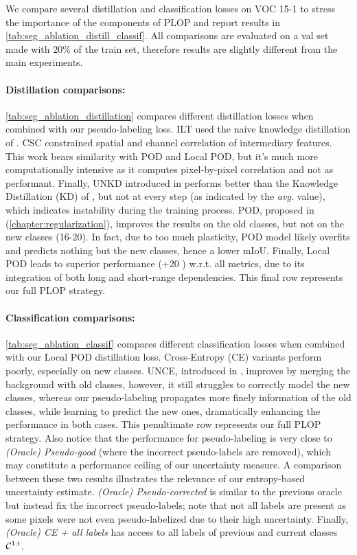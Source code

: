 We compare several distillation and classification losses on VOC 15-1 to stress the importance of
the components of PLOP and report results in \autoref{tab:seg_ablation_distill_classif}. All
comparisons are evaluated on a val set made with 20\% of the train set, therefore results are
slightly different from the main experiments.

\paragraph{Distillation comparisons:} \autoref{tab:seg_ablation_distillation} compares different
distillation losses when combined with our pseudo-labeling loss. ILT \citep{michieli2019ilt} used
the naive knowledge distillation of \cite{hinton2015knowledge_distillation}. CSC \citep{park2020csc}
constrained spatial and channel correlation of intermediary features. This work bears similarity
with POD and Local POD, but it's much more computationally intensive as it computes pixel-by-pixel
correlation and not as performant. Finally, UNKD introduced in
\cite{cermelli2020modelingthebackground} performs better than the Knowledge Distillation (KD) of
\cite{hinton2015knowledge_distillation}, but not at every step (as indicated by the \textit{avg.}
value), which indicates instability during the training process. POD, proposed in
\cite{douillard2020podnet} (\autoref{chapter:regularization}), improves the results on the old
classes, but not on the new classes (16-20). In fact, due to too much plasticity, POD model likely
overfits and predicts nothing but the new classes, hence a lower \ac{mIoU}.  Finally, Local POD
leads to superior performance (+20 \pp) w.r.t. all metrics, due to its integration of both long and
short-range dependencies. This final row represents our full PLOP strategy.


\paragraph{Classification comparisons:} \autoref{tab:seg_ablation_classif} compares different
classification losses when combined with our Local POD distillation loss. Cross-Entropy (CE)
variants perform poorly, especially on new classes. UNCE, introduced in
\citep{cermelli2020modelingthebackground}, improves by merging the background with old classes,
however, it still struggles to correctly model the new classes, whereas our pseudo-labeling
propagates more finely information of the old classes, while learning to predict the new ones,
dramatically enhancing the performance in both cases. This penultimate row represents our full PLOP
strategy. Also notice that the performance for pseudo-labeling is very close to
\textit{(Oracle) Pseudo-good} (where the incorrect pseudo-labels are removed), which may constitute a
performance ceiling of our uncertainty measure. A comparison between these two results illustrates
the relevance of our entropy-based uncertainty estimate. \textit{(Oracle) Pseudo-corrected} is
similar to the previous oracle but instead fix the incorrect pseudo-labels; note that not all labels
are present as some pixels were not even pseudo-labelized due to their high uncertainty. Finally,
\textit{(Oracle) CE + all labels} has access to all labels of previous and current classes
$\mathcal{C}^{1:t}$.


